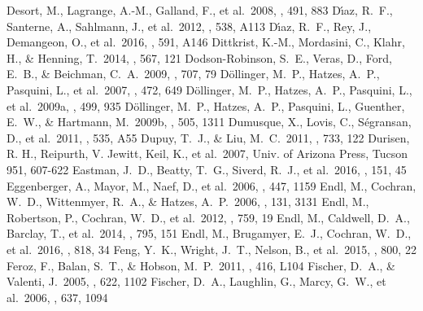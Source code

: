 \documentclass[twocolumn]{aastex62}
\begin{document}
\begin{CJK*}{UTF8}{min}
\begin{thebibliography}{}
 Desort, M., Lagrange, A.-M., Galland, F., et al.\ 2008, \aap, 491, 883
 D{\'{\i}}az, R.~F., Santerne, A., Sahlmann, J., et al.\ 2012, \aap, 538, A113
 D{\'{\i}}az, R.~F., Rey, J., Demangeon, O., et al.\ 2016, \aap, 591, A146
 Dittkrist, K.-M., Mordasini, C., Klahr, H., \& Henning, T.\ 2014, \aap, 567, 121
 Dodson-Robinson, S.~E., Veras, D., Ford, E.~B., \& Beichman, C.~A.\ 2009, \apj, 707, 79
 D{\"o}llinger, M.~P., Hatzes, A.~P., Pasquini, L., et al.\ 2007, \aap, 472, 649
 D{\"o}llinger, M.~P., Hatzes, A.~P., Pasquini, L., et al.\ 2009a, \aap, 499, 935
 D{\"o}llinger, M.~P., Hatzes, A.~P., Pasquini, L., Guenther, E.~W., \& Hartmann, M.\ 2009b, \aap, 505, 1311
 Dumusque, X., Lovis, C., S{\'e}gransan, D., et al.\ 2011, \aap, 535, A55
 Dupuy, T.~J., \& Liu, M.~C.\ 2011, \apj, 733, 122
 Durisen, R. H., Reipurth, V. Jewitt, Keil, K., et al.\ 2007, Univ. of Arizona Press, Tucson 951, 607-622
 Eastman, J.~D., Beatty, T.~G., Siverd, R.~J., et al.\ 2016, \aj, 151, 45
 Eggenberger, A., Mayor, M., Naef, D., et al.\ 2006, \aap, 447, 1159
 Endl, M., Cochran, W.~D., Wittenmyer, R.~A., \& Hatzes, A.~P.\ 2006, \aj, 131, 3131
 Endl, M., Robertson, P., Cochran, W.~D., et al.\ 2012, \apj, 759, 19
 Endl, M., Caldwell, D.~A., Barclay, T., et al.\ 2014, \apj, 795, 151
 Endl, M., Brugamyer, E.~J., Cochran, W.~D., et al.\ 2016, \apj, 818, 34
 Feng, Y.~K., Wright, J.~T., Nelson, B., et al.\ 2015, \apj, 800, 22
 Feroz, F., Balan, S.~T., \& Hobson, M.~P.\ 2011, \mnras, 416, L104
 Fischer, D.~A., \& Valenti, J.\ 2005, \apj, 622, 1102
 Fischer, D.~A., Laughlin, G., Marcy, G.~W., et al.\ 2006, \apj, 637, 1094

\end{thebibliography}
\end{CJK*}
\end{document}
